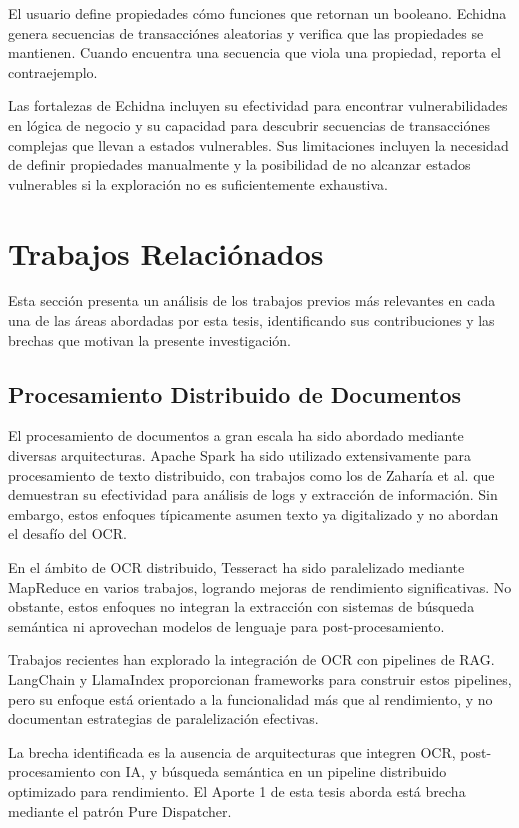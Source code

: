 \documentclass[12pt,a4paper,twoside]{book}
\begin{document}
El usuario define propiedades cómo funciones que retornan un booleano. Echidna genera secuencias de transacciónes aleatorias y verifica que las propiedades se mantienen. Cuando encuentra una secuencia que viola una propiedad, reporta el contraejemplo.

Las fortalezas de Echidna incluyen su efectividad para encontrar vulnerabilidades en lógica de negocio y su capacidad para descubrir secuencias de transacciónes complejas que llevan a estados vulnerables. Sus limitaciones incluyen la necesidad de definir propiedades manualmente y la posibilidad de no alcanzar estados vulnerables si la exploración no es suficientemente exhaustiva.

\section{Trabajos Relaciónados}

Esta sección presenta un análisis de los trabajos previos más relevantes en cada una de las áreas abordadas por esta tesis, identificando sus contribuciones y las brechas que motivan la presente investigación.

\subsection{Procesamiento Distribuido de Documentos}

El procesamiento de documentos a gran escala ha sido abordado mediante diversas arquitecturas. Apache Spark ha sido utilizado extensivamente para procesamiento de texto distribuido, con trabajos como los de Zaharía et al. que demuestran su efectividad para análisis de logs y extracción de información. Sin embargo, estos enfoques típicamente asumen texto ya digitalizado y no abordan el desafío del OCR.

En el ámbito de OCR distribuido, Tesseract ha sido paralelizado mediante MapReduce en varios trabajos, logrando mejoras de rendimiento significativas. No obstante, estos enfoques no integran la extracción con sistemas de búsqueda semántica ni aprovechan modelos de lenguaje para post-procesamiento.

Trabajos recientes han explorado la integración de OCR con pipelines de RAG. LangChain y LlamaIndex proporcionan frameworks para construir estos pipelines, pero su enfoque está orientado a la funcionalidad más que al rendimiento, y no documentan estrategias de paralelización efectivas.

La brecha identificada es la ausencia de arquitecturas que integren OCR, post-procesamiento con IA, y búsqueda semántica en un pipeline distribuido optimizado para rendimiento. El Aporte 1 de esta tesis aborda está brecha mediante el patrón Pure Dispatcher.
\end{document}
